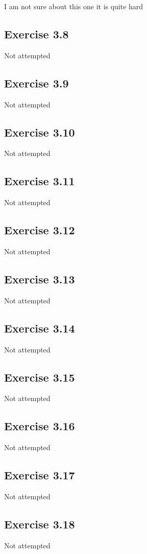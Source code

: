 I am not sure about this one it is quite hard
\subsection{Exercise 3.8}
Not attempted

\subsection{Exercise 3.9}
Not attempted

\subsection{Exercise 3.10}
Not attempted

\subsection{Exercise 3.11}
Not attempted

\subsection{Exercise 3.12}
Not attempted

\subsection{Exercise 3.13}
Not attempted

\subsection{Exercise 3.14}
Not attempted

\subsection{Exercise 3.15}
Not attempted

\subsection{Exercise 3.16}
Not attempted

\subsection{Exercise 3.17}
Not attempted

\subsection{Exercise 3.18}
Not attempted

